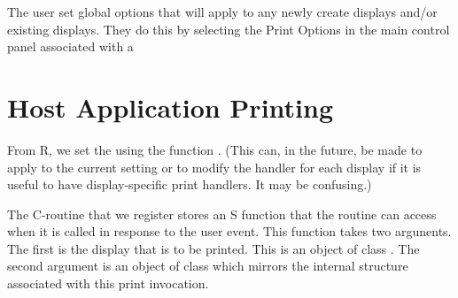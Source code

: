 \documentclass{article}
\begin{document}
The user set global options that will apply to any newly create
displays and/or existing displays.  They do this by selecting the
Print Options in the main control panel associated with a

\section{Host Application Printing}

From R, we set the  using the function
.  (This can, in the future, be made
to apply to the current setting or to modify the handler for each
display if it is useful to have display-specific print handlers. It
may be confusing.)

The C-routine that we register stores an S function that the routine
can access when it is called in response to the user event.  This
function takes two argunents. The first is the display that is to be
printed. This is an object of class .  The second
argument is an object of class  which
mirrors the internal  structure associated with
this print invocation.
\end{document}
